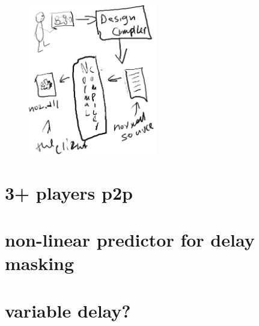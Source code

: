 \documentclass{article}
\begin{document}
 
\begin{figure}[h]
	\centering
		\includegraphics[width=0.50\textwidth]{idea1.jpg}
	\label{fig:idea1}
\end{figure}


\section{3+ players p2p}

\section{non-linear predictor for delay masking}

\section{variable delay?}
\end{document}
